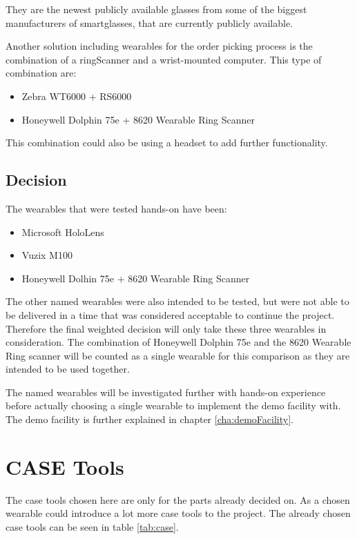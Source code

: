 They are the newest publicly available glasses from some of the biggest manufacturers of \gls{smartglasses}, that are currently publicly available.

Another solution including wearables for the order picking process is the combination of a \gls{ringScanner} and a wrist-mounted computer. This type of combination are:

\begin{itemize}
	\item Zebra WT6000 + RS6000
	\item Honeywell Dolphin 75e + 8620 Wearable Ring Scanner
\end{itemize}

This combination could also be using a headset to add further functionality.

\subsection{Decision}

The wearables that were tested hands-on have been:
\begin{itemize}
	\item Microsoft HoloLens
	\item Vuzix M100
	\item Honeywell Dolhin 75e + 8620 Wearable Ring Scanner
\end{itemize}

The other named wearables were also intended to be tested, but were not able to be delivered in a time that was considered acceptable to continue the project. Therefore the final weighted decision will only take these three wearables in consideration. The combination of Honeywell Dolphin 75e and the 8620 Wearable Ring scanner will be counted as a single wearable for this comparison as they are intended to be used together.



 

The named wearables will be investigated further with hands-on experience before actually choosing a single wearable to implement the demo facility with. The demo facility is further explained in chapter \ref{cha:demoFacility}.

\cleardoublepage

\section{CASE Tools}\label{sec:caseTools}
The \gls{case} tools chosen here are only for the parts already decided on. As a chosen wearable could introduce a lot more \gls{case} tools to the project. The already chosen \gls{case} tools can be seen in table \ref{tab:case}.

